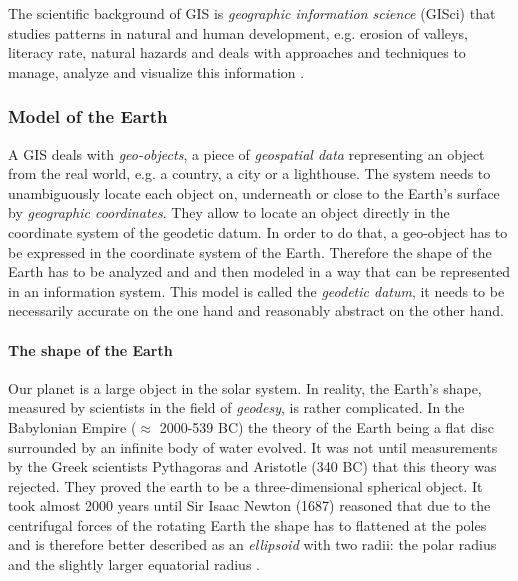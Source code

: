 The scientific background of GIS is \emph{geographic information science} (GISci) that studies patterns in natural and human development, e.g. erosion of valleys, literacy rate, natural hazards and deals with approaches and techniques to manage, analyze and visualize this information
\cite{ngGeography}.



\subsubsection{Model of the Earth} %
\label{ssub:model_of_the_earth}

A GIS deals with \emph{geo-objects}, a piece of \emph{geospatial data} representing an object from the real world, e.g. a country, a city or a lighthouse. The system needs to unambiguously locate each object on, underneath or close to the Earth's surface by \emph{geographic coordinates}. They allow to locate an object directly in the coordinate system of the geodetic datum. In order to do that, a geo-object has to be expressed in the coordinate system of the Earth. Therefore the shape of the Earth has to be analyzed and and then modeled in a way that can be represented in an information system. This model is called the \emph{geodetic datum}, it needs to be necessarily accurate on the one hand and reasonably abstract on the other hand.


\paragraph{The shape of the Earth} %
\label{par:the_shape_of_the_earth}

Our planet is a large object in the solar system. In reality, the Earth's shape, measured by scientists in the field of \emph{geodesy}, is rather complicated. In the Babylonian Empire ($\approx$ 2000-539 BC) the theory of the Earth being a flat disc surrounded by an infinite body of water
evolved. It was not until measurements by the Greek scientists Pythagoras and Aristotle (340 BC) that this theory was rejected. They proved the earth to be a three-dimensional spherical object. It took almost 2000 years until Sir Isaac Newton (1687) reasoned that due to the centrifugal forces of the rotating Earth the shape has to flattened at the poles and is therefore better described as an \emph{ellipsoid} with two radii: the polar radius and the slightly larger equatorial radius
\cite[pp. 69-77]{bolstad2008gis}.

